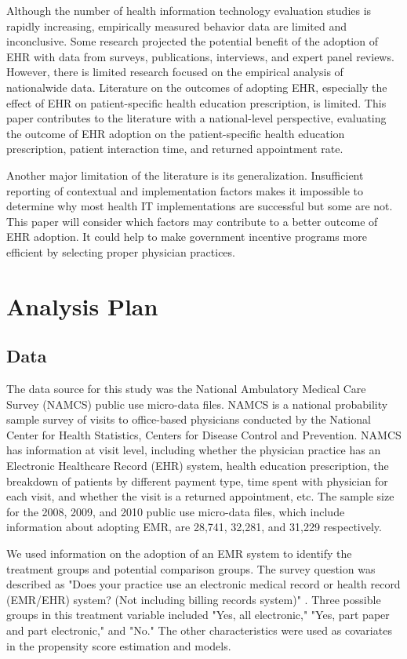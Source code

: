 \documentclass[12pt]{report}
\begin{document}
Although the number of health information technology evaluation studies is rapidly increasing, empirically measured behavior data are limited and inconclusive. Some research projected the potential benefit of the adoption of EHR with data from surveys, publications, interviews, and expert panel reviews. However, there is limited research focused on the empirical analysis of nationalwide data. Literature on the outcomes of adopting EHR, especially the effect of EHR on patient-specific health education prescription, is limited. This paper contributes to the literature with a national-level perspective, evaluating the outcome of EHR adoption on the patient-specific health education prescription, patient interaction time, and returned appointment rate.

Another major limitation of the literature is its generalization. Insufficient reporting of contextual and implementation factors makes it impossible to determine why most health IT implementations are successful but some are not. This paper will consider which factors may contribute to a better outcome of EHR adoption. It could help to make government incentive programs more efficient by selecting proper physician practices.



\chapter{Analysis Plan}
\label{chapter:analysisplan}
\section{Data}
The data source for this study was the National Ambulatory Medical Care Survey (NAMCS) public use micro-data files. NAMCS is a national probability sample survey of visits to office-based physicians conducted by the National Center for Health Statistics, Centers for Disease Control and Prevention. NAMCS has information at visit level, including whether the physician practice has an Electronic Healthcare Record (EHR) system, health education prescription, the breakdown of patients by different payment type, time spent with physician for each visit, and whether the visit is a returned appointment, etc. The sample size for the 2008, 2009, and 2010 public use micro-data files, which include information about adopting EMR, are 28,741, 32,281, and 31,229 respectively.

We used information on the adoption of an EMR system to identify the treatment groups and potential comparison groups. The survey question was described as "Does your practice use an electronic medical record or health record (EMR/EHR) system? (Not including billing records system)" \citep{NAMCSDOC2010}. Three possible groups in this treatment variable included "Yes, all electronic," "Yes, part paper and part electronic," and "No." The other characteristics were used as covariates in the propensity score estimation and models.
\end{document}
